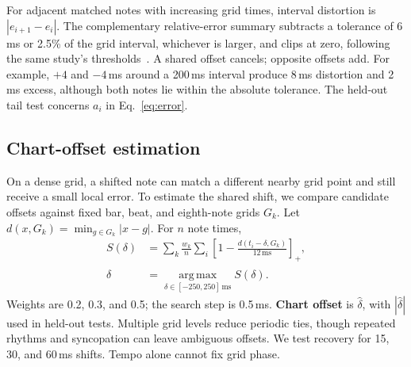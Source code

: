 \documentclass[letterpaper]{article}
\newcommand{\pos}[1]{\left[#1\right]_+}
\begin{document}
For adjacent matched notes with increasing grid times, interval distortion
is $|e_{i+1}-e_i|$. The complementary relative-error summary subtracts a
tolerance of 6\,ms or 2.5\% of the grid interval, whichever is larger, and
clips at zero, following the same study's thresholds~\cite{friberg1995jnd}.
A shared offset cancels; opposite offsets add. For example, $+4$ and
$-4$\,ms around a 200\,ms interval produce 8\,ms distortion and 2\,ms excess,
although both notes lie within the absolute tolerance. The held-out tail
test concerns $a_i$ in Eq.~\ref{eq:error}.

\subsection{Chart-offset estimation}
On a dense grid, a shifted note can match a different nearby grid point and
still receive a small local error. To estimate the shared shift, we compare
candidate offsets against fixed bar, beat, and eighth-note grids $G_k$.
Let $d(x,G_k)=\min_{g\in G_k}|x-g|$. For $n$ note times,
\begin{equation}
\begin{aligned}
 S(\delta)&=\sum_k\frac{w_k}{n}\sum_i
 \pos{1-\frac{d(t_i-\delta,G_k)}{12\,\mathrm{ms}}},\\
 \hat\delta&=\operatorname*{arg\,max}_{\delta\in[-250,250]\,\mathrm{ms}}
 S(\delta).
\end{aligned}
\label{eq:offset}
\end{equation}
Weights are 0.2, 0.3, and 0.5; the search step is 0.5\,ms.
\textbf{Chart offset} is $\hat\delta$, with $|\hat\delta|$ used in held-out
tests. Multiple grid levels reduce periodic ties, though repeated rhythms
and syncopation can leave ambiguous offsets. We test recovery for 15, 30,
and 60\,ms shifts. Tempo alone cannot fix grid phase.

\begin{table}[t]
\centering
\caption{Held-out responses to controlled errors on 80 songs. Rank
correlation is with edit strength; strongest-edit change is the strongest
edit minus its matched control. Timing tail error and chart offset are
sign-reversed, with changes in ms, so negative values indicate the expected
response, which need not be monotone (Sec.~\ref{sec:heldout}).
Brackets show Bonferroni-adjusted 99.5\% song-bootstrap intervals. A test
passes if both upper bounds are negative, every control passes, and at least
72 songs are evaluable; all nine pass, and all 32 controls show zero
difference.}
\label{tab:results}
\setlength{\tabcolsep}{4pt}
\fontsize{9}{11}\selectfont
\renewcommand{\arraystretch}{1.15}

\end{table}
\end{document}
